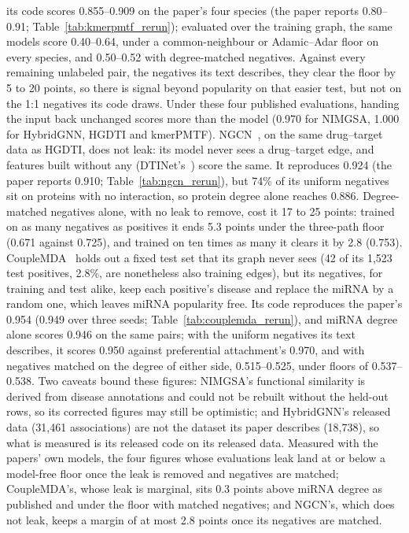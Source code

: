 \documentclass[review]{elsarticle}
\begin{document}
its code scores 0.855--0.909 on the paper's four species (the paper reports 0.80--0.91;
Table~\ref{tab:kmerpmtf_rerun}); evaluated over the training graph, the same models score 0.40--0.64, under a
common-neighbour or Adamic--Adar floor on every species, and 0.50--0.52 with degree-matched negatives. Against
every remaining unlabeled pair, the negatives its text describes, they clear the floor by 5 to 20 points, so
there is signal beyond popularity on that easier test, but not on the 1:1 negatives its code draws. Under these
four published evaluations, handing the input back unchanged scores more than the model (0.970 for NIMGSA, 1.000
for HybridGNN, HGDTI and kmerPMTF). NGCN~\cite{cao2024ngcn}, on the same drug--target data as HGDTI, does not leak: its model
never sees a drug--target edge, and features built without any (DTINet's~\cite{luo2017dtinet}) score the same.
It reproduces 0.924 (the paper reports 0.910; Table~\ref{tab:ngcn_rerun}), but 74\% of its uniform negatives sit
on proteins with no interaction, so protein degree alone reaches 0.886. Degree-matched negatives alone, with no
leak to remove, cost it 17 to 25 points: trained on as many negatives as positives it ends 5.3 points under the
three-path floor (0.671 against 0.725), and trained on ten times as many it clears it by 2.8 (0.753).
CoupleMDA~\cite{li2025couplemda} holds out a fixed test set that its graph never sees (42 of its 1,523 test
positives, 2.8\%, are nonetheless also training edges), but its negatives, for training and test alike, keep
each positive's disease and replace the miRNA by a random one, which leaves miRNA popularity free. Its code
reproduces the paper's 0.954 (0.949 over three seeds; Table~\ref{tab:couplemda_rerun}), and miRNA degree
alone scores 0.946 on the same pairs; with the uniform negatives its text describes, it scores 0.950 against
preferential attachment's 0.970, and with negatives matched on the degree of either side, 0.515--0.525, under
floors of 0.537--0.538. Two caveats bound these
figures: NIMGSA's functional similarity is derived from disease annotations and could not be rebuilt
without the held-out rows, so its corrected figures may still be optimistic; and HybridGNN's released data
(31,461 associations) are not the dataset its paper describes (18,738), so what is measured is its released
code on its released data. Measured with the papers' own models, the four figures whose evaluations leak land at
or below a model-free floor once the leak is removed and negatives are matched; CoupleMDA's, whose leak is
marginal, sits 0.3 points above miRNA degree as published and under the floor with matched negatives; and NGCN's,
which does not leak, keeps a margin of at most 2.8 points once its negatives are matched.
\end{document}
